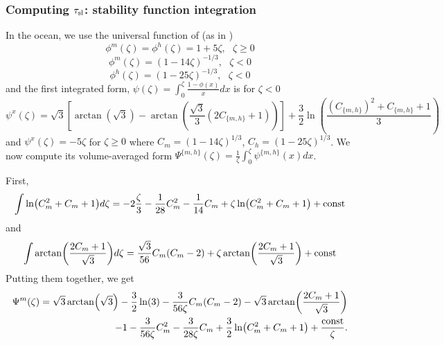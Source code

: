 \subsubsection{Computing $\tau_{\rm sl}$: stability function integration}
\label{sec:ND_Ocean_stabilityFunctionIntegration}
In the ocean, we use the universal function of \citep{large_similarity_2019} (as in \citep{pelletier_two-sided_2021})
\begin{equation}
	\phi^m(\zeta) = \phi^h(\zeta) = 1+5\zeta, ~~~ \zeta \geq 0
\end{equation}
\begin{equation}
	\phi^m(\zeta) = (1-14\zeta)^{-1/3}, ~~~ \zeta < 0
\end{equation}
\begin{equation}
	\phi^h(\zeta) = (1-25\zeta)^{-1/3}, ~~~ \zeta < 0
\end{equation}
and the first integrated form, $\psi(\zeta)= \int_0^\zeta \frac{1-\phi(x)}{x}dx$ is for $\zeta<0$
\begin{equation}
	\psi^x(\zeta)  = \sqrt{3}\left[\arctan(\sqrt{3}) -
	\arctan\left(\frac{\sqrt{3}}{3}(2C_{\{m,h\}}+1)\right)\right]
	+ \frac{3}{2}\ln \left(\frac{(C_{\{m,h\}})^2 + C_{\{m,h\}} + 1}{3}\right)
\end{equation}
and $\psi^x(\zeta) = -5\zeta$ for $\zeta \geq 0$
where $C_m = (1-14\zeta)^{1/3}$, $C_h = (1-25\zeta)^{1/3}$.
We now compute its volume-averaged form $\Psi^{\{m,h\}}(\zeta)= \frac{1}{\zeta}\int_0^\zeta \psi^{\{m,h\}}(x)dx$.
\par
First,
\begin{equation}
	\int \ln (C_m^2+C_m+1)d\zeta
	= -2 \frac{\zeta}{3} - \frac{1}{28}C_m^2 - \frac{1}{14}C_m
	+\zeta\ln (C_m^2+C_m+1) + {\rm const}
\end{equation}
and
\begin{equation}
	\int \arctan (\frac{2C_m+1}{\sqrt{3}})d\zeta
	= \frac{\sqrt{3}}{56}C_m(C_m-2)
	+ \zeta \arctan (\frac{2C_m+1}{\sqrt{3}}) + {\rm const}
\end{equation}
Putting them together, we get
\begin{equation}
\begin{aligned}
	\Psi^m(\zeta)=\sqrt{3}\arctan(\sqrt{3})- 
	\frac{3}{2}\ln(3) -
	\frac{3}{56\zeta}C_m(C_m-2)
	- \sqrt{3} \arctan (\frac{2C_m+1}{\sqrt{3}})
	\\
	-1 - \frac{3}{56\zeta}C_m^2 - \frac{3}{28\zeta}C_m
	+\frac{3}{2}\ln (C_m^2+C_m+1)
	+ \frac{{\rm const}}{\zeta}.
\end{aligned}
\end{equation}
